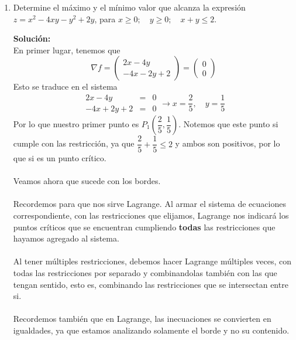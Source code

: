 \documentclass[12pt]{article}
\newenvironment{solucion}
{\begin{mdframed}[backgroundcolor=black!10]
		{\bf Solución:}\\
	}
	{
	\end{mdframed}
}
\newenvironment{preguntas}
{\begin{enumerate}\itemsep12pt
	}
	{
	\end{enumerate}
}
\newcommand{\ra}{\rightarrow}
\begin{document}
\begin{preguntas}
\begin{solucion}
\begin{itemize}
$$1 + y^2 = 10 \ra y^2 = 9 \ra y_1 = 3, \quad y_2 = -3$$
Por lo tanto, los puntos obtenidos son
$$P_4(-1,3), \quad P_5(-1,-3)$$
\end{itemize}
Finalmente, evaluamos los puntos críticos obtenidos en la función original, esto es
$$f(P_1) = f(1,0) = 1-2+3 =2$$
$$f(P_2) = f(\sqrt[]{10},0) = 10 - 2\ \sqrt[]{10} + 3 = 13 - 2\ \sqrt[]{10}$$
$$f(P_3) = f(-\ \sqrt[]{10},0) = 10 + 2\ \sqrt[]{10} + 3 = 13 + 2\ \sqrt[]{10}$$
$$f(P_4) = f(-1,3) = 1+18+2+3=24$$
$$f(P_5) = f(-1,-3) = 1+18+2+3=24$$
Por lo tanto, concluimos que el máximo es $24$ ($P_4$ y $P_5$) y el mínimo es 2 ($P_1$).
\end{solucion}
\item Determine el máximo y el mínimo valor que alcanza la expresión $z=x^2-4xy-y^2+2y$, para $x\geq0;\quad y\geq0;\quad x+y\leq2$.
\begin{solucion}
En primer lugar, tenemos que
$$\nabla f = \begin{pmatrix} 2x - 4y \\ -4x-2y+2 \end{pmatrix} = \begin{pmatrix} 0 \\ 0 \end{pmatrix}$$
Esto se traduce en el sistema
$$\begin{array}{rcl} 2x-4y & = & 0 \\ -4x+2y+2 & = & 0 \end{array}
\ra 
x = \dfrac{2}{5}, \quad y = \dfrac{1}{5}$$
Por lo que nuestro primer punto es $P_1\left(\dfrac{2}{5}, \dfrac{1}{5}\right)$. Notemos que este punto si cumple con las restricción, ya que $\dfrac{2}{5} + \dfrac{1}{5} \leq 2$ y ambos son positivos, por lo que si es un punto crítico.\\
\\
Veamos ahora que sucede con los bordes. \\
\\
Recordemos para que nos sirve Lagrange. Al armar el sistema de ecuaciones\\ correspondiente, con las restricciones que elijamos, Lagrange nos indicará los puntos críticos que se encuentran cumpliendo \textbf{todas} las restricciones que hayamos agregado al sistema. \\
\\
Al tener múltiples restricciones, debemos hacer Lagrange múltiples veces, con todas las restricciones por separado y combinandolas también con las que tengan sentido, esto es, combinando las restricciones que se intersectan entre si.\\
\\
Recordemos también que en Lagrange, las inecuaciones se convierten en igualdades, ya que estamos analizando solamente el borde y no su contenido.\\


\end{solucion}
\end{preguntas}
\end{document}

